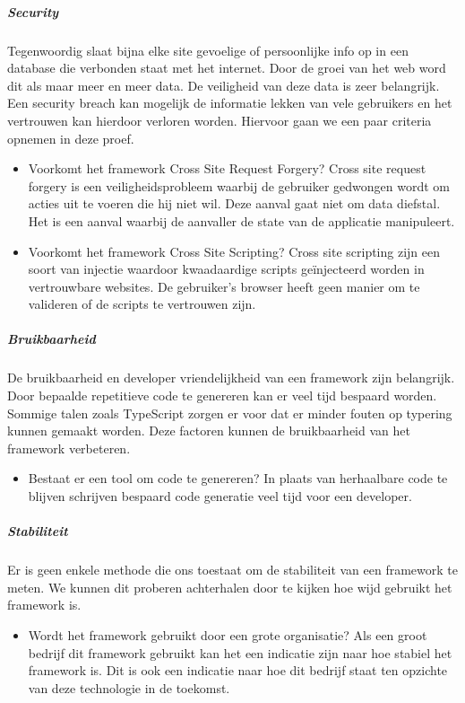 \subparagraph{Security}
Tegenwoordig slaat bijna elke site gevoelige of persoonlijke info op in een database die verbonden staat met het internet. Door de groei van het web word dit als maar meer en meer data. De veiligheid van deze data is zeer belangrijk. Een security breach kan mogelijk de informatie lekken van vele gebruikers en het vertrouwen kan hierdoor verloren worden. Hiervoor gaan we een paar criteria opnemen in deze proef.

\begin{itemize}
	\item Voorkomt het framework Cross Site Request Forgery? Cross site request forgery is een veiligheidsprobleem waarbij de gebruiker gedwongen wordt om acties uit te voeren die hij niet wil. Deze aanval gaat niet om data diefstal. Het is een aanval waarbij de aanvaller de state van de applicatie manipuleert.
	\item Voorkomt het framework Cross Site Scripting? Cross site scripting zijn een soort van injectie waardoor kwaadaardige scripts geïnjecteerd worden in vertrouwbare websites. De gebruiker’s browser heeft geen manier om te valideren of de scripts te vertrouwen zijn.
\end{itemize}

\subparagraph{Bruikbaarheid}
De bruikbaarheid en developer vriendelijkheid van een framework zijn belangrijk. Door bepaalde repetitieve code te genereren kan er veel tijd bespaard worden. Sommige talen zoals TypeScript zorgen er voor dat er minder fouten op typering kunnen gemaakt worden. Deze factoren kunnen de bruikbaarheid van het framework verbeteren.

\begin{itemize}
	\item Bestaat er een tool om code te genereren? In plaats van herhaalbare code te blijven schrijven bespaard code generatie veel tijd voor een developer.
\end{itemize}

\subparagraph{Stabiliteit}
Er is geen enkele methode die ons toestaat om de stabiliteit van een framework te meten. We kunnen dit proberen achterhalen door te kijken hoe wijd gebruikt het framework is.

\begin{itemize}
	\item Wordt het framework gebruikt door een grote organisatie? Als een groot bedrijf dit framework gebruikt kan het een indicatie zijn naar hoe stabiel het framework is. Dit is ook een indicatie naar hoe dit bedrijf staat ten opzichte van deze technologie in de toekomst.
\end{itemize}

